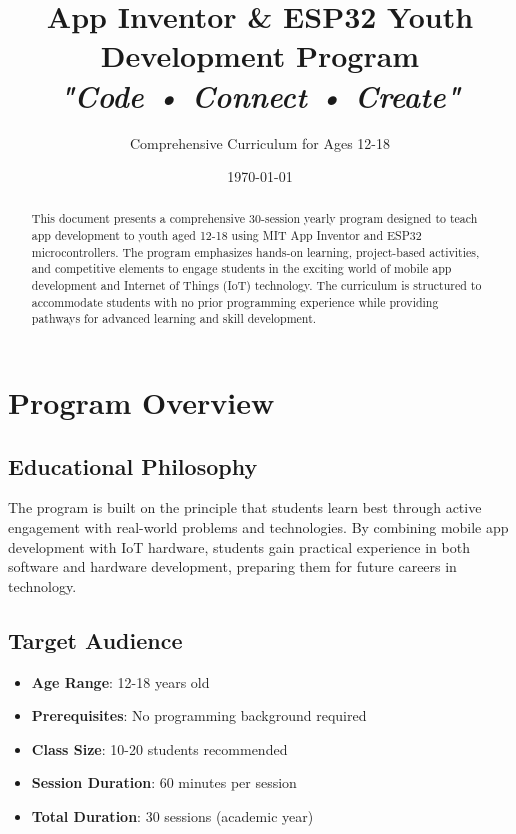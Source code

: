 \documentclass[12pt,a4paper]{article}
\begin{document}
\title{\Huge\textbf{App Inventor \& ESP32 Youth Development Program}\\
\Large\textit{"Code • Connect • Create"}}
\author{Comprehensive Curriculum for Ages 12-18}
\date{\today}

\maketitle

\begin{abstract}
This document presents a comprehensive 30-session yearly program designed to teach app development to youth aged 12-18 using MIT App Inventor and ESP32 microcontrollers. The program emphasizes hands-on learning, project-based activities, and competitive elements to engage students in the exciting world of mobile app development and Internet of Things (IoT) technology. The curriculum is structured to accommodate students with no prior programming experience while providing pathways for advanced learning and skill development.
\end{abstract}

\tableofcontents
\newpage

\section{Program Overview}

\subsection{Educational Philosophy}
The program is built on the principle that students learn best through active engagement with real-world problems and technologies. By combining mobile app development with IoT hardware, students gain practical experience in both software and hardware development, preparing them for future careers in technology.

\subsection{Target Audience}
\begin{itemize}
    \item \textbf{Age Range}: 12-18 years old
    \item \textbf{Prerequisites}: No programming background required
    \item \textbf{Class Size}: 10-20 students recommended
    \item \textbf{Session Duration}: 60 minutes per session
    \item \textbf{Total Duration}: 30 sessions (academic year)
\end{itemize}
\end{document}
